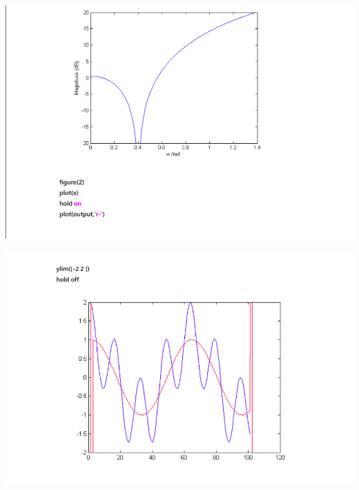\documentclass[a4paper]{article}
\begin{document}
	
	
	\begin{center}
		\includegraphics[width=1\linewidth]{screenshot114}
	\end{center}
	
	
	\begin{center}
		\includegraphics[width=1\linewidth]{screenshot115}
	\end{center}
	
	
\newpage


	
	
	
	
	
\end{document}
